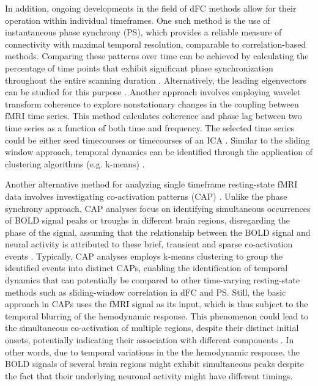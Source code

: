 In addition, ongoing developments in the field of dFC methods allow for their
operation within individual timeframes. One such method is the use of
instantaneous phase synchrony (PS), which provides a reliable measure of
connectivity with maximal temporal resolution, comparable to correlation-based
methods. Comparing these patterns over time can be achieved by calculating the
percentage of time points that exhibit significant phase synchronization
throughout the entire scanning duration
\citep{Glerean2012FunctionalMagneticResonance}. Alternatively, the leading
eigenvectors can be studied for this purpose
\citep{Cabral2017Cognitiveperformancehealthy}. Another approach involves
employing wavelet transform coherence to explore nonstationary changes in the
coupling between fMRI time series. This method calculates coherence and phase
lag between two time series as a function of both time and frequency. The
selected time series could be either seed timecourses
\citep{Chang2010Timefrequencydynamicsresting} or timecourses of an ICA
\citep{Yaesoubi2015Dynamiccoherenceanalysis}. Similar to the sliding window
approach, temporal dynamics can be identified through the application of
clustering algorithms (e.g. k-means)
\citep{Yaesoubi2015Dynamiccoherenceanalysis,Cabral2017Cognitiveperformancehealthy}.

Another alternative method for analyzing single timeframe resting-state fMRI
data involves investigating co-activation patterns (CAP)
\citep{Tagliazucchi2012Criticalitylargescale,Liu2013Decompositionspontaneousbrain,Chen2015Introducingcoactivation,Liu2018Coactivationpatterns}.
Unlike the phase synchrony approach, CAP analyses focus on
identifying simultaneous occurrences of BOLD signal peaks or troughs in
different brain regions, disregarding the phase of the signal, assuming that the
relationship between the BOLD signal and neural activity is attributed to these
brief, transient and sparse co-activation events
\citep{Zhang2020relationshipBOLDneural}. Typically, CAP analyses employs k-means
clustering to group the identified events into distinct CAPs, enabling the
identification of temporal dynamics that can potentially be compared to other
time-varying resting-state methods such as sliding-window correlation in dFC and
PS. Still, the basic approach in CAPs uses the fMRI signal as its input, which
is thus subject to the temporal blurring of the hemodynamic response. This
phenomenon could lead to the simultaneous co-activation of multiple regions,
despite their distinct initial onsets, potentially indicating their association
with different components \citep{Rangaprakash2018Hemodynamicresponsefunction}.
In other words, due to temporal variations in the the hemodynamic response, the
BOLD signals of several brain regions might exhibit simultaneous peaks despite
the fact that their underlying neuronal activity might have different timings.

